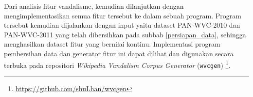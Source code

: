 Dari analisis fitur vandalisme, kemudian dilanjutkan
dengan mengimplementasikan semua fitur tersebut ke dalam sebuah program.
Program tersebut kemudian dijalankan dengan input yaitu dataset PAN-WVC-2010
dan PAN-WVC-2011 yang telah dibersihkan pada subbab \ref{persiapan_data},
sehingga menghasilkan dataset fitur yang bernilai kontinu.
Implementasi program pembersihan data dan generator fitur ini dapat dilihat dan
digunakan secara terbuka pada repositori \textit{Wikipedia Vandalism Corpus
Generator} (\texttt{wvcgen})
\footnote{\url{https://github.com/shuLhan/wvcgen}}.
